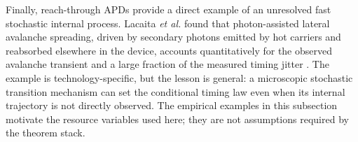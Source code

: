 Finally, reach-through APDs provide a direct example of an unresolved fast stochastic internal process. Lacaita \emph{et al.} found that photon-assisted lateral avalanche spreading, driven by secondary photons emitted by hot carriers and reabsorbed elsewhere in the device, accounts quantitatively for the observed avalanche transient and a large fraction of the measured timing jitter \cite{Lacaita1993}. The example is technology-specific, but the lesson is general: a microscopic stochastic transition mechanism can set the conditional timing law even when its internal trajectory is not directly observed. The empirical examples in this subsection motivate the resource variables used here; they are not assumptions required by the theorem stack.
